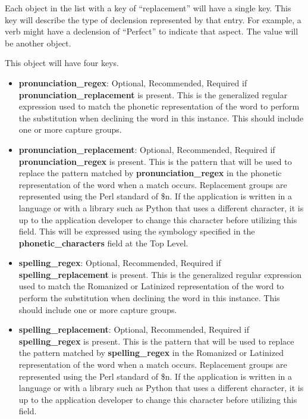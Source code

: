 Each object in the list with a key of ``replacement'' will have a single key.   This key will describe the type of declension represented by that entry.  For example, a verb might have a declension of ``Perfect'' to indicate that aspect.  The value will be another object.

This object will have four keys.
\begin{itemize}
	\item \textbf{pronunciation\_regex}: Optional, Recommended, Required if \textbf{pronunciation\_replacement} is present.  This is the generalized regular expression used to match the phonetic representation of the word to perform the substitution when declining the word in this instance.  This should include one or more capture groups.
	\item \textbf{pronunciation\_replacement}: Optional, Recommended, Required if \textbf{pronunciation\_regex} is present.  This is the pattern that will be used to replace the pattern matched by \textbf{pronunciation\_regex} in the phonetic representation of the word when a match occurs.  Replacement groups are represented using the Perl standard of \$n.  If the application is written in a language or with a library such as Python that uses a different character, it is up to the application developer to change this character before utilizing this field.  This will be expressed using the symbology specified in the \textbf{phonetic\_characters} field at the Top Level.
	\item \textbf{spelling\_regex}: Optional, Recommended, Required if \textbf{spelling\_replacement} is present.  This is the generalized regular expression used to match the Romanized or Latinized representation of the word to perform the substitution when declining the word in this instance.  This should include one or more capture groups.
	\item \textbf{spelling\_replacement}: Optional, Recommended, Required if \textbf{spelling\_regex} is present.  This is the pattern that will be used to replace the pattern matched by \textbf{spelling\_regex} in the Romanized or Latinized representation of the word when a match occurs.  Replacement groups are represented using the Perl standard of \$n.  If the application is written in a language or with a library such as Python that uses a different character, it is up to the application developer to change this character before utilizing this field.
\end{itemize}

